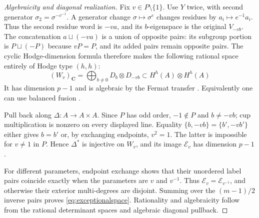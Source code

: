 \documentclass[11pt]{article}
\theoremstyle{definition}
\newcommand{\C}{\mathbf C}
\begin{document}
\begin{proof}[Algebraicity and diagonal realization]
Fix $v\in P\setminus\{1\}$. Use $Y$ twice, with second generator
$\sigma_2=\sigma^{-v^{-1}}$. A generator change $\sigma\mapsto\sigma^e$
changes residues by $a_i\mapsto e^{-1}a_i$. Thus the second residue word
is $-va$, and its $b$-eigenspace is the original $V_{-vb}$.
The concatenation $a\sqcup(-va)$ is a union of opposite pairs:
its subgroup portion is $P\sqcup(-P)$ because $vP=P$, and its added
pairs remain opposite pairs. The cyclic Hodge-dimension formula therefore
makes the following rational space entirely of Hodge type $(h,h)$:
\[
 (W_v)_\C=\bigoplus_{b\ne0}D_b\otimes D_{-vb}
                    \subset H^h(A)\otimes H^h(A)
\]
It has dimension $p-1$ and is algebraic by the Fermat transfer
\cite[Corollary 1.2]{Fermat}. Equivalently one can use balanced fusion
\cite[Theorem 1.1]{Fusion}.

Pull back along $\Delta:A\to A\times A$. Since $P$ has odd order,
$-1\notin P$ and $b\ne-vb$; cup multiplication is nonzero on every
displayed line. Equality $\{b,-vb\}=\{b',-vb'\}$ either gives
$b=b'$ or, by exchanging endpoints, $v^2=1$. The latter is impossible
for $v\ne1$ in $P$. Hence $\Delta^*$ is injective on $W_v$, and its
image $\mathscr E_v$ has dimension $p-1$.

For different parameters, endpoint exchange shows that their unordered
label pairs coincide exactly when the parameters are $v$ and $v^{-1}$.
Thus $\mathscr E_v=\mathscr E_{v^{-1}}$, and otherwise their exterior
multi-degrees are disjoint. Summing over the $(m-1)/2$ inverse pairs
proves \eqref{eq:exceptionalspace}. Rationality and algebraicity follow
from the rational determinant spaces and algebraic diagonal pullback.
\end{proof}
\end{document}
